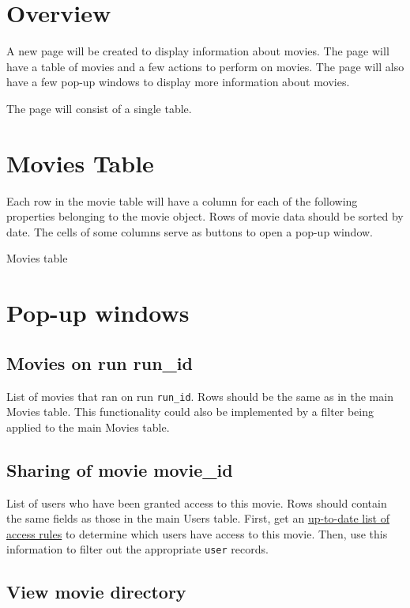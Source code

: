
\section{Overview}

A new page will be created to display information about movies. The page will
have a table of movies and a few actions to perform on movies. The page will
also have a few pop-up windows to display more information about movies.

\noindent The page will consist of a single table.

\section{Movies Table}
Each row in the movie table will have a column for each of the following properties 
belonging to the movie object. Rows of movie data should be sorted by date. The 
cells of some columns serve as buttons to open a pop-up window.

\begin{table}[h]
    
    \caption{Movies table}
\end{table}

\section{Pop-up windows}

\subsection{Movies on run run\_id}
List of movies that ran on run \texttt{run\_id}. Rows should be the same as in the main 
Movies table. This functionality could also be implemented by a filter being applied 
to the main Movies table.

\subsection{Sharing of movie movie\_id}
List of users who have been granted access to this movie. Rows should contain the 
same fields as those in the main Users table. First, get an 
\hyperref[section:updatingcollectionaccessrules]{up-to-date list of access rules} 
to determine which users have access to this movie. Then, use this information 
to filter out the appropriate \texttt{user} records.

\subsection{View movie directory}

